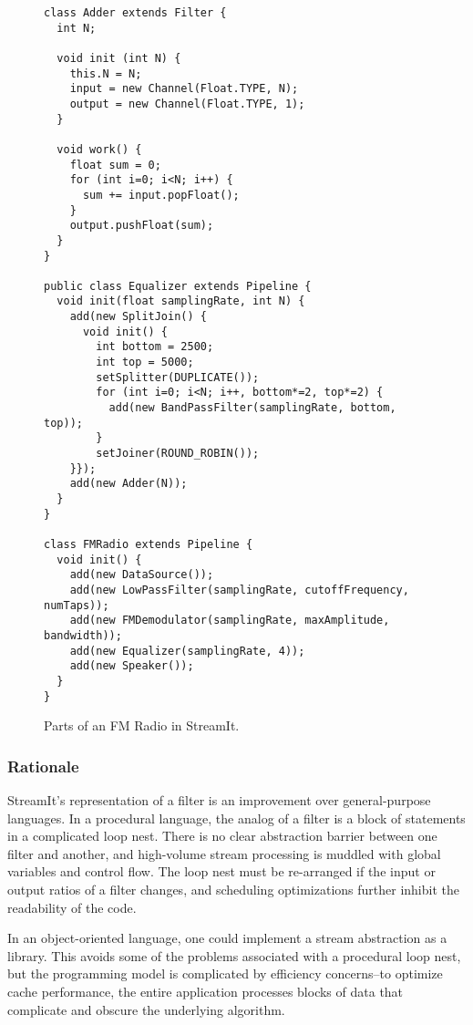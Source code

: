 \begin{figure}
\scriptsize
\begin{verbatim}
class Adder extends Filter {
  int N;

  void init (int N) {
    this.N = N;
    input = new Channel(Float.TYPE, N);
    output = new Channel(Float.TYPE, 1);
  }
  
  void work() {
    float sum = 0;
    for (int i=0; i<N; i++) {
      sum += input.popFloat();
    }
    output.pushFloat(sum);
  }
}

public class Equalizer extends Pipeline {
  void init(float samplingRate, int N) {
    add(new SplitJoin() {
      void init() {
        int bottom = 2500;
        int top = 5000;
        setSplitter(DUPLICATE());
        for (int i=0; i<N; i++, bottom*=2, top*=2) {
          add(new BandPassFilter(samplingRate, bottom, top));
        }
        setJoiner(ROUND_ROBIN());
    }});
    add(new Adder(N));
  }
}
  
class FMRadio extends Pipeline {
  void init() {
    add(new DataSource());
    add(new LowPassFilter(samplingRate, cutoffFrequency, numTaps));
    add(new FMDemodulator(samplingRate, maxAmplitude, bandwidth));
    add(new Equalizer(samplingRate, 4));
    add(new Speaker());
  }
}
\end{verbatim}
\vspace{-12pt}
\caption{Parts of an FM Radio in StreamIt.
\protect\label{fig:radiocode}}
\vspace{-12pt}
\end{figure}

\subsubsection{Rationale}
\label{sec:oo-rat}

StreamIt's representation of a filter is an improvement over
general-purpose languages.  In a procedural language, the analog of a
filter is a block of statements in a complicated loop nest.  There is
no clear abstraction barrier between one filter and another, and
high-volume stream processing is muddled with global variables and
control flow. The loop nest must be re-arranged if the input or output
ratios of a filter changes, and scheduling optimizations further
inhibit the readability of the code.

In an object-oriented language, one could implement a stream
abstraction as a library.  This avoids some of the problems associated
with a procedural loop nest, but the programming model is complicated
by efficiency concerns--to optimize cache performance, the entire
application processes blocks of data that complicate and obscure the
underlying algorithm.

